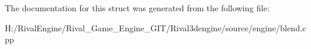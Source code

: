 The documentation for this struct was generated from the following file\+:\begin{DoxyCompactItemize}
\item 
H\+:/\+Rival\+Engine/\+Rival\+\_\+\+Game\+\_\+\+Engine\+\_\+\+G\+I\+T/\+Rival3dengine/source/engine/blend.\+cpp\end{DoxyCompactItemize}
